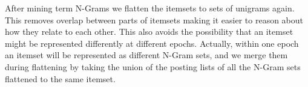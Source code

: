 \documentclass{sig-alternate}
\begin{document}
After mining term N-Grams we flatten the itemsets to sets of unigrams again. This removes overlap between parts of  itemsets making it easier to reason about how they relate to each other. This also avoids the possibility that an itemset might be represented differently at different epochs. Actually, within one epoch an itemset will be represented as different N-Gram sets, and we merge them during flattening by taking the union of the posting lists of all the N-Gram sets flattened to the same itemset.

\end{document}
